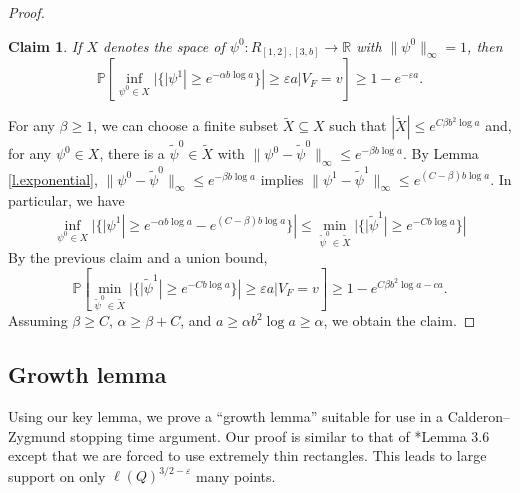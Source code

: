 \documentclass{amsart}
\newtheorem{claim}[equation]{Claim}
\newcommand{\lref}[1]{Lemma \ref{l.#1}}
\numberwithin{equation}{section}
\numberwithin{figure}{section}
\newcommand{\R}{\mathbb{R}}
\renewcommand{\P}{\mathbb{P}}
\newcommand{\ep}{\varepsilon}
\begin{document}
\begin{proof}
\begin{claim}
\label{cl.inversebound}
If $X$ denotes the space of $\psi^0 : R_{[1,2],[3,b]} \to \R$ with $\| \psi^0 \|_\infty = 1$, then
\begin{equation*}
\P[\inf_{\psi^0 \in X} |\{|\psi^1| \geq e^{- \alpha b \log a} \}| \geq \ep a | V_F = v] \geq 1 - e^{-\ep a}.
\end{equation*}
\end{claim}

For any $\beta \geq 1$, we can choose a finite subset $\tilde X \subseteq X$ such that $|\tilde X| \leq e^{C \beta b^2 \log a}$ and, for any $\psi^0 \in X$, there is a $\tilde \psi^0 \in \tilde X$ with $\|\psi^0 - \tilde \psi^0\|_\infty \leq e^{-\beta b \log a}$.  By \lref{exponential}, $\| \psi^0 - \tilde \psi^0 \|_\infty \leq e^{- \beta b \log a}$ implies $\| \psi^1 -  \tilde \psi^1 \|_\infty \leq e^{(C - \beta) b \log a}$.  In particular, we have
\begin{equation*}
\inf_{\psi^0 \in X} |\{|\psi^1| \geq e^{- \alpha b \log a} - e^{(C - \beta) b \log a} \}| \leq \min_{\tilde \psi^0 \in \tilde X} |\{ |\tilde \psi^1| \geq e^{- C b \log a} \}|
\end{equation*}
By the previous claim and a union bound,
\begin{equation*}
\P[\min_{\tilde \psi^0 \in \tilde X} |\{ |\tilde \psi^1| \geq e^{- C b \log a} \}| \geq \ep a | V_F = v] \geq 1 - e^{C \beta b^2 \log a - c a}.
\end{equation*}
Assuming $\beta \geq C$, $\alpha \geq \beta + C$, and $a \geq \alpha b^2 \log a \geq \alpha$, we obtain the claim.
\end{proof}

\subsection{Growth lemma}

Using our key lemma, we prove a ``growth lemma'' suitable for use in a Calderon--Zygmund stopping time argument.  Our proof is similar to that of \cite{Buhovsky-Logunov-Malinnikova-Sodin}*{Lemma 3.6} except that we are forced to use extremely thin rectangles.  This leads to large support on only $\ell(Q)^{3/2-\ep}$ many points.
\end{document}
